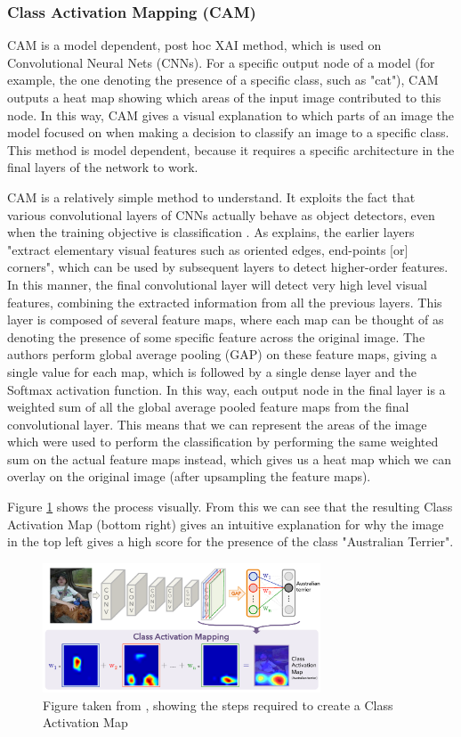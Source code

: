 \documentclass[UKenglish]{uiomasterthesis} %
\theoremstyle{definition}
\begin{document}
\subsubsection{Class Activation Mapping (CAM)}

CAM \cite{cam} is a model dependent, post hoc XAI method, which is used on Convolutional Neural Nets (CNNs). For a specific output node of a model (for example, the one denoting the presence of a specific class, such as "cat"), CAM outputs a heat map showing which areas of the input image contributed to this node. In this way, CAM gives a visual explanation to which parts of an image the model focused on when making a decision to classify an image to a specific class. This method is model dependent, because it requires a specific architecture in the final layers of the network to work.

CAM is a relatively simple method to understand. It exploits the fact that various convolutional layers of CNNs actually behave as object detectors, even when the training objective is classification \cite{cam}. As \cite{lenet5} explains, the earlier layers "extract elementary visual features such as oriented edges, end-points [or] corners", which can be used by subsequent layers to detect higher-order features. In this manner, the final convolutional layer will detect very high level visual features, combining the extracted information from all the previous layers. This layer is composed of several feature maps, where each map can be thought of as denoting the presence of some specific feature across the original image. The authors perform global average pooling (GAP) on these feature maps, giving a single value for each map, which is followed by a single dense layer and the Softmax activation function. In this way, each output node in the final layer is a weighted sum of all the global average pooled feature maps from the final convolutional layer. This means that we can represent the areas of the image which were used to perform the classification by performing the same weighted sum on the actual feature maps instead, which gives us a heat map which we can overlay on the original image (after upsampling the feature maps).

Figure \ref{camimg} shows the process visually. From this we can see that the resulting Class Activation Map (bottom right) gives an intuitive explanation for why the image in the top left gives a high score for the presence of the class "Australian Terrier".

\begin{figure}[h]
\centerline{\includegraphics[width=3.25in]{figure/cam.pdf}}
\caption{Figure taken from \cite{cam}, showing the steps required to create a Class Activation Map}
\label{camimg}
\end{figure}
\end{document}
